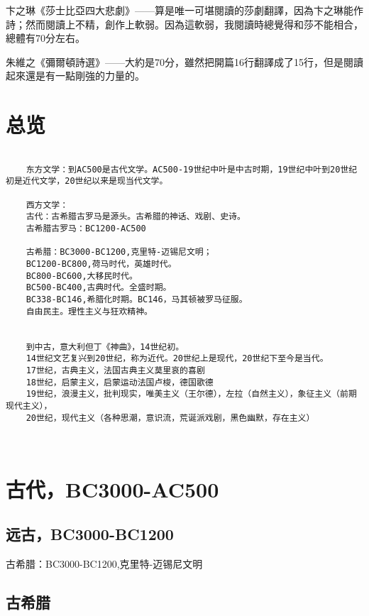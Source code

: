 \documentclass[UTF8]{../../RepresentationUniverse}
\begin{document}
卞之琳《莎士比亞四大悲劇》——算是唯一可堪閱讀的莎劇翻譯，因為卞之琳能作詩；然而閱讀上不精，創作上軟弱。因為這軟弱，我閱讀時總覺得和莎不能相合，總體有70分左右。


朱維之《彌爾頓詩選》——大約是70分，雖然把開篇16行翻譯成了15行，但是閱讀起來還是有一點剛強的力量的。


\chapter{总览}



\begin{lstlisting}

    东方文学：到AC500是古代文学。AC500-19世纪中叶是中古时期，19世纪中叶到20世纪初是近代文学，20世纪以来是现当代文学。

    西方文学：
    古代：古希腊古罗马是源头。古希腊的神话、戏剧、史诗。
    古希腊古罗马：BC1200-AC500
    
    古希腊：BC3000-BC1200,克里特-迈锡尼文明；
    BC1200-BC800,荷马时代，英雄时代。
    BC800-BC600,大移民时代。
    BC500-BC400,古典时代。全盛时期。
    BC338-BC146,希腊化时期。BC146，马其顿被罗马征服。
    自由民主。理性主义与狂欢精神。
    
    
    到中古，意大利但丁《神曲》，14世纪初。
    14世纪文艺复兴到20世纪，称为近代。20世纪上是现代，20世纪下至今是当代。
    17世纪，古典主义，法国古典主义莫里哀的喜剧
    18世纪，启蒙主义，启蒙运动法国卢梭，德国歌德
    19世纪，浪漫主义，批判现实，唯美主义（王尔德），左拉（自然主义），象征主义（前期现代主义），
    20世纪，现代主义（各种思潮，意识流，荒诞派戏剧，黑色幽默，存在主义）
    
    
\end{lstlisting}




\chapter{古代，BC3000-AC500}

\section{远古，BC3000-BC1200}

古希腊：BC3000-BC1200,克里特-迈锡尼文明


\section{古希腊}
\end{document}
